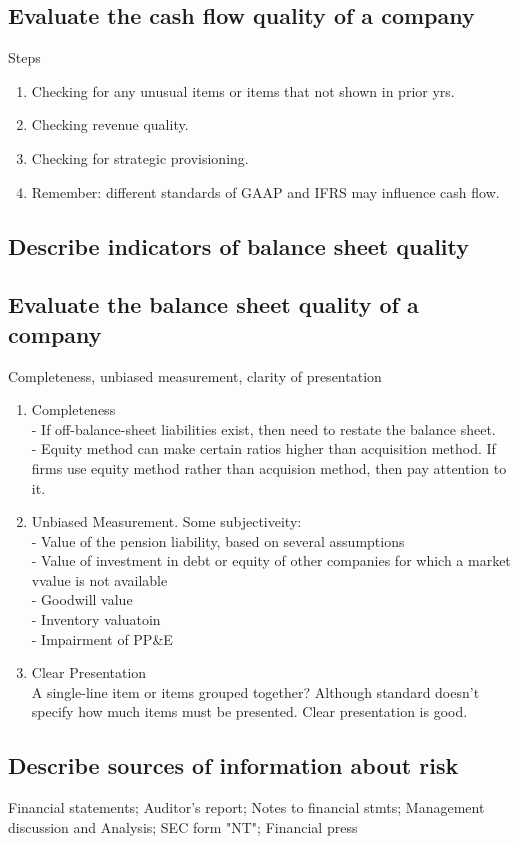 \documentclass{article}
\newcommand{\be}{\begin{enumerate}}
\newcommand{\ee}{\end{enumerate}}
\begin{document}
\subsection{Evaluate the cash flow quality of a company}
Steps
\be
    \item Checking for any unusual items or items that not shown in prior yrs.
    \item Checking revenue quality.
    \item Checking for strategic provisioning.
    \item Remember: different standards of GAAP and IFRS may influence cash flow.
\ee
\subsection{Describe indicators of balance sheet quality}
\subsection{Evaluate the balance sheet quality of a company}
Completeness, unbiased measurement, clarity of presentation
\be
    \item Completeness
        \\- If off-balance-sheet liabilities exist, then need to restate the balance sheet.
        \\- Equity method can make certain ratios higher than acquisition method. If firms 
        use equity method rather than acquision method, then pay attention to it.
    \item Unbiased Measurement. Some subjectiveity:
        \\- Value of the pension liability, based on several assumptions
        \\- Value of investment in debt or equity of other companies for which
        a market vvalue is not available
        \\- Goodwill value
        \\- Inventory valuatoin
        \\- Impairment of PP\&E
    \item Clear Presentation
        \\A single-line item or items grouped together? Although standard 
        doesn't specify how much items must be presented. Clear presentation is good.
\ee
\subsection{Describe sources of information about risk}
Financial statements; Auditor's report; Notes to financial stmts; Management discussion and Analysis;
SEC form "NT"; Financial press
\end{document}
